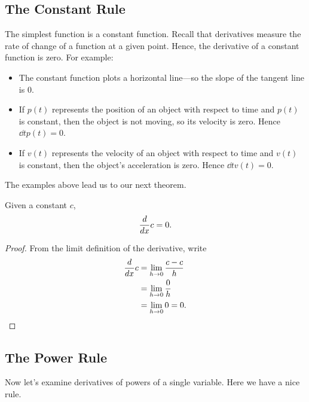 \subsection{The Constant Rule}

The simplest function is a constant function.  Recall that derivatives
measure the rate of change of a function at a given point. Hence, the
derivative of a constant function is zero. For example:
\begin{itemize}
\item The constant function plots a horizontal line---so the slope of
  the tangent line is $0$.
\item If $p(t)$ represents the position of an object with respect to
  time and $p(t)$ is constant, then the object is not moving, so its
  velocity is zero. Hence $\dd{t} p(t) = 0$.
\item If $v(t)$ represents the velocity of an object with respect to
  time and $v(t)$ is constant, then the object's acceleration is
  zero. Hence $\dd{t} v(t) = 0$.
\end{itemize}
The examples above lead us to our next theorem.


\begin{mainTheorem}
Given a constant $c$,
\[
\frac{d}{dx} c = 0.
\]
\end{mainTheorem}

\begin{proof}
From the limit definition of the derivative, write
\begin{align*}
\frac{d}{dx} c &= \lim_{h\to 0}\frac{c-c}{h}\\
&= \lim_{h\to 0} \frac{0}{h}\\
&= \lim_{h\to 0} 0 = 0.
\end{align*}
\end{proof}


\subsection{The Power Rule}

Now let's examine derivatives of powers of a single variable.  Here we
have a nice rule.

